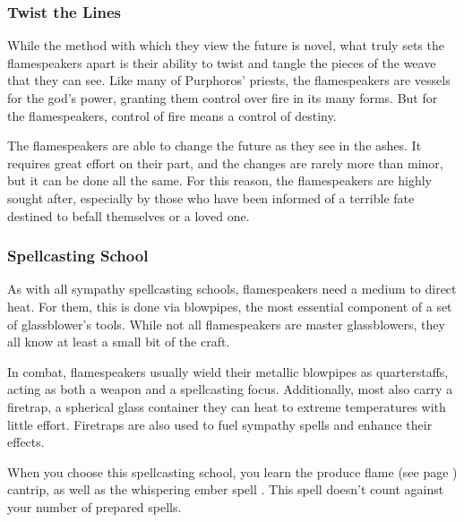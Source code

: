     \subsubsection{Twist the Lines}
        While the method with which they view the future is novel, what truly sets the flamespeakers apart is their ability to twist and tangle the pieces of the weave that they can see.
        Like many of Purphoros' priests, the flamespeakers are vessels for the god's power, granting them control over fire in its many forms.
        But for the flamespeakers, control of fire means a control of destiny.

        The flamespeakers are able to change the future as they see in the ashes.
        It requires great effort on their part, and the changes are rarely more than minor, but it can be done all the same.
        For this reason, the flamespeakers are highly sought after, especially by those who have been informed of a terrible fate destined to befall themselves or a loved one.

    \subsubsection{Spellcasting School}
        As with all sympathy spellcasting schools, flamespeakers need a medium to direct heat.
        For them, this is done via blowpipes, the most essential component of a set of glassblower's tools.
        While not all flamespeakers are master glassblowers, they all know at least a small bit of the craft.

        In combat, flamespeakers usually wield their metallic blowpipes as quarterstaffs, acting as both a weapon and a spellcasting focus.
        Additionally, most also carry a firetrap, a spherical glass container they can heat to extreme temperatures with little effort. %
        Firetraps are also used to fuel sympathy spells and enhance their effects.

        When you choose this spellcasting school, you learn the produce flame (see page \pageref{spell::produceflame}) cantrip, as well as the whispering ember spell \pageref{spell::whisperingember}.
        This spell doesn't count against your number of prepared spells.
